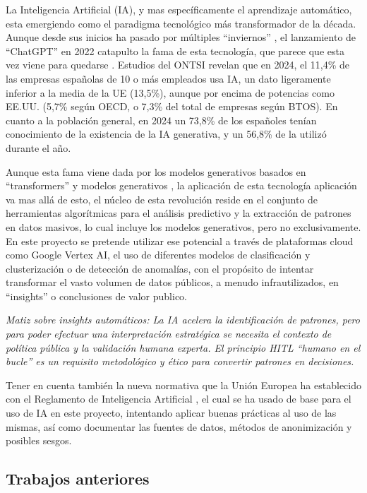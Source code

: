 La Inteligencia Artificial (IA), y mas específicamente el aprendizaje automático,  esta emergiendo como el paradigma tecnológico más transformador de la década. Aunque desde sus inicios ha pasado por múltiples ``inviernos'' \citep{Cheok2023AIHistory} , el lanzamiento de ``ChatGPT'' en 2022 catapulto la fama de esta tecnología, que parece que esta vez viene para quedarse \citep{TrendsGoogleIA2025}. Estudios del ONTSI \citep{ontsi2025indicadores} revelan que en 2024, el 11,4\% de las empresas españolas de 10 o más empleados usa IA, un dato ligeramente inferior a la media de la UE (13,5\%), aunque por encima de potencias como EE.UU. (5,7\% según OECD, o 7,3\% del total de empresas según BTOS). En cuanto a la población general, en 2024 un 73,8\% de los españoles tenían conocimiento de la existencia de la IA generativa, y un 56,8\% de la utilizó durante el año.

Aunque esta fama viene dada por los modelos generativos basados en ``transformers'' y modelos generativos  \citep{vaswani2017attention}, la aplicación de esta tecnología aplicación va mas allá de esto, el núcleo de esta revolución reside en  el conjunto de herramientas algorítmicas para el análisis predictivo y la extracción de patrones en datos masivos, lo cual incluye los modelos generativos, pero no exclusivamente. En este proyecto se pretende utilizar ese potencial a través de plataformas cloud como Google Vertex AI, el uso de diferentes modelos de clasificación y clusterización o de detección de anomalías, con el propósito de intentar transformar el vasto volumen de datos públicos, a menudo infrautilizados, en ``insights'' o conclusiones de valor publico.

\emph{Matiz sobre insights automáticos: La IA acelera la identificación de patrones, pero para poder efectuar una interpretación estratégica se necesita el contexto de política pública y la validación humana experta. El principio HITL ``humano en el bucle'' \citep{MosqueiraRey2023} es un requisito metodológico y ético para convertir patrones en decisiones.}




Tener en cuenta también la nueva normativa que la Unión Europea ha establecido con el Reglamento de Inteligencia Artificial \citep{webRIA2024Europa}, el cual se ha usado de base para el uso de IA en este proyecto, intentando aplicar buenas prácticas al uso de las mismas, así como documentar las fuentes de datos, métodos de anonimización y posibles sesgos.
	
	\subsection{Trabajos anteriores}


